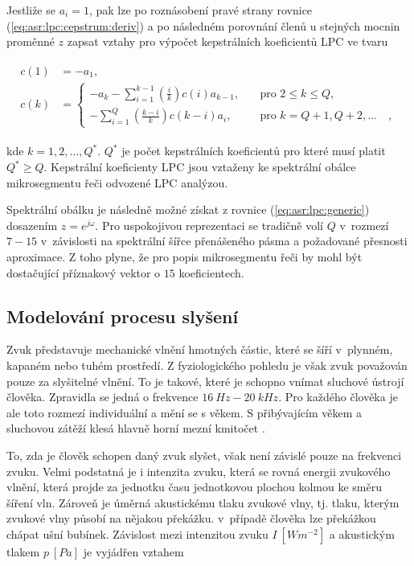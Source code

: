 \noindent Jestliže se $a_i = 1$, pak lze po roznásobení pravé strany rovnice (\ref{eq:asr:lpc:cepstrum:deriv}) a po následném porovnání členů u stejných mocnin proměnné $z$ zapsat vztahy pro výpočet kepstrálních koeficientů LPC ve tvaru

\begin{align}
  \begin{split}
    c(1) &= -a_1, \\
    c(k) &=
    \begin{cases}
      - a_k - \sum_{i=1}^{k-1} \left(\frac{i}{k}\right) c(i) a_{k-1},  & \quad \text{pro } 2 \leq k \leq Q, \\
      - \sum_{i=1}^{Q} \left(\frac{k - i}{k}\right) c(k-i) a_i,  & \quad \text{pro } k = Q + 1, Q + 2, \dots \quad ,
    \end{cases}
  \end{split}
  \label{eq:asr:lpc:cepstrum:coef}
\end{align}

\noindent kde $k = 1, 2, \dots , Q^{*}$. $Q^{*}$ je počet kepstrálních koeficientů pro které musí platit $Q^{*} \geq Q$. Kepstrální koeficienty LPC jsou vztaženy ke spektrální obálce mikrosegmentu řeči odvozené LPC analýzou.

Spektrální obálku je následně možné získat z rovnice (\ref{eq:asr:lpc:generic}) dosazením $z = e^{j\omega}$. Pro uspokojivou reprezentaci se tradičně volí $Q$ v~rozmezí $7-15$ v~závislosti na spektrální šířce přenášeného pásma a požadované přesnosti aproximace. Z toho plyne, že pro popis mikrosegmentu řeči by mohl být dostačující příznakový vektor o $15$ koeficientech.

\subsection{Modelování procesu slyšení}
\label{chap:asr:parametrization:hearing}

Zvuk představuje mechanické vlnění hmotných částic, které se šíří v~plynném, kapaném nebo tuhém prostředí. Z fyziologického pohledu je však zvuk považován pouze za slyšitelné vlnění. To je takové, které je schopno vnímat sluchové ústrojí člověka. Zpravidla se jedná o frekvence $16\ Hz - 20\ kHz$. Pro každého člověka je ale toto rozmezí individuální a mění se s věkem. S přibývajícím věkem a sluchovou zátěží klesá hlavně horní mezní kmitočet \cite{Psutka2006}.

To, zda je člověk schopen daný zvuk slyšet, však není závislé pouze na frekvenci zvuku. Velmi podstatná je i intenzita zvuku, která se rovná energii zvukového vlnění, která projde za jednotku času jednotkovou plochou kolmou ke směru šíření vln. Zároveň je úměrná akustickému tlaku zvukové vlny, tj. tlaku, kterým zvukové vlny působí na nějakou překážku. v~případě člověka lze překážkou chápat ušní bubínek. Závislost mezi intenzitou zvuku $I\ \left[Wm^{-2}\right]$ a akustickým tlakem $p\ \left[Pa\right]$ je vyjádřen vztahem

